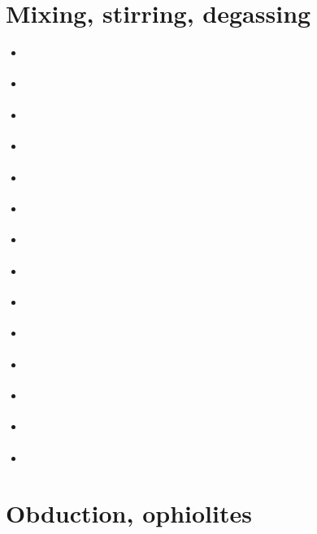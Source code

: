 \section{Mixing, stirring, degassing} 

\begin{scriptsize}
\begin{itemize}
\item[\nineteeneightyfour] 
\textcite{olyb84} 
\item[\nineteenninety] 
\textcite{ketu90} 
\item[\nineteenninety] 
\textcite{davi90} 
\item[\nineteenninetysix] 
\textcite{pelt96} 
\item[\nineteenninetyeight]
\textcite{vaba98} 
\item[\nineteenninetynine] 
\textcite{cori99} 
\item[\twothousandone] 
\textcite{huke01} 
\item[\twothousandtwo] 
\textcite{vahb02} 
\item[\twothousandthree] 
\textcite{fasa03} 
\textcite{vabh03} 
\item[\twothousandfive] 
\textcite{colt05} 
\item[\twothousandseven] 
\textcite{gogc07} 
\textcite{nake07} 
\textcite{vabh07} 
\item[\twothousandeleven] 
\textcite{lemj11} 
\textcite{saad11} 
\item[\twothousandeighteen] 
\textcite{onzh18} 
\item[\twothousandtwentytwo] 
\textcite{onau22} 
\end{itemize}
\end{scriptsize}

\section{Obduction, ophiolites}

